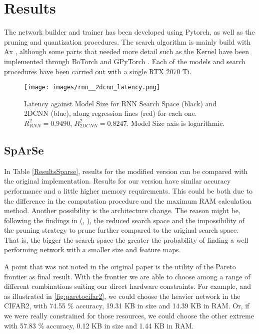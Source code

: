 \documentclass[10pt, a4paper, twocolumn]{article}
\begin{document}
\section{Results}

The network builder and trainer has been developed using Pytorch, as well as the pruning and quantization procedures. The search algorithm is mainly build with Ax \cite{Bakshy2018a}, although some parts that needed more detail such as the Kernel have been implemented through BoTorch \cite{Balandat2019} and GPyTorch \cite{Gardner2018}. Each of the models and search procedures have been carried out with a single RTX 2070 Ti. 

\begin{figure}
	\centering
	\texttt{[image: images/rnn\_\_2dcnn\_latency.png]}
	\caption{Latency against Model Size for RNN Search Space (black) and 2DCNN (blue), along regression lines (red) for each one. $R^{2}_{RNN} = 0.9490$, $R^{2}_{2DCNN} = 0.8247$. Model Size axis is logarithmic.  }
	\label{fig:latency}
\end{figure}

\subsection{SpArSe}

In Table \ref{ResultsSparse}, results for the modified version can be compared with the original implementation. Results for our version have similar accuracy performance and a little higher memory requirements. This could be both due to the difference in the computation procedure and the maximum RAM calculation method. Another possibility is the architecture change. The reason might be, following the findings in (\cite{Frankle2019}, \cite{Cai2019f}), the reduced search space and the impossibility of the pruning strategy to prune further compared to the original search space. That is, the bigger the search space the greater the probability of finding a well performing network with a smaller size and feature maps. 

A point that was not noted in the original paper is the utility of the Pareto frontier as final result. With the frontier we are able to choose among a range of different combinations suiting our direct hardware constraints. For example, and as illustrated in \ref{fig:paretocifar2}, we could choose the heavier network in the CIFAR2, with 74.55 $\%$ accuracy, 19.31 KB in size and 14.39 KB in RAM. Or, if we were really constrained for those resources, we could choose the other extreme with 57.83 $\%$ accuracy, 0.12 KB  in size and 1.44 KB in RAM. 
\end{document}

